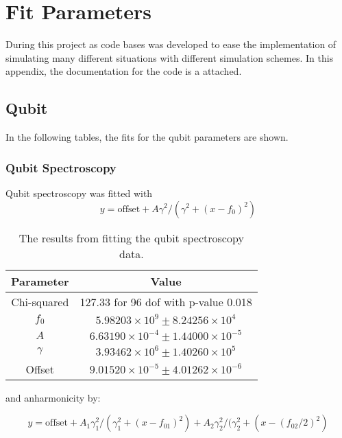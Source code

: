 \chapter{Fit Parameters}\label{chap:code_documentation}
During this project as code bases was developed to ease the implementation of simulating many different situations with different simulation schemes. In this appendix, the documentation for the code is a attached.


\section{Qubit}
In the following tables, the fits for the qubit parameters are shown.
\subsection{Qubit Spectroscopy}
Qubit spectroscopy was fitted with 
\begin{equation}
    y = \text{offset} + A\gamma^2/(\gamma^2 + (x - f_0)^2)
\end{equation}
\begin{table}[h]
\centering
\begin{tabular}{|c|c|}
\hline
Parameter & Value \\
\hline
Chi-squared & 127.33 for 96 dof with p-value 0.018 \\
$f_0$ & $5.98203 \times 10^9 \pm 8.24256 \times 10^4$ \\
$A$ & $6.63190 \times 10^{-4} \pm 1.44000 \times 10^{-5}$ \\
$\gamma$ & $3.93462 \times 10^6 \pm 1.40260 \times 10^5$ \\
Offset & $9.01520 \times 10^{-5} \pm 4.01262 \times 10^{-6}$ \\
\hline
\end{tabular}
\caption{The results from fitting the qubit spectroscopy data.}
\label{tab:fit_outcomes_third}
\end{table}
\FloatBarrier
and anharmonicity by:
\begin{fullwidth}
\begin{equation}
    y = \text{offset} + A_1\gamma_1^2/(\gamma_1^2 + (x - f_{01})^2) + A_2\gamma_2^2/(\gamma_2^2 + (x - (f_{02} / 2)^2) 
\end{equation}
\end{fullwidth}

